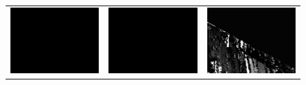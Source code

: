 \documentclass[11pt]{report}
\begin{document}
\begin{figure}[H]
\begin{tabular}{ccc}
    \includegraphics[scale=0.1]{images/disparity-opencv-t/disparity_5.png} &
    \includegraphics[scale=0.1]{images/disparity-opencv-d/disparity_5.png} &
    \includegraphics[scale=0.1]{images/disparity-opengv/disparity_5.png} \\

\end{tabular}
\end{figure}
\end{document}
